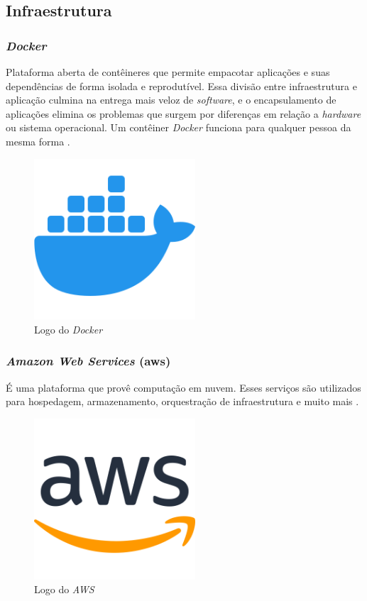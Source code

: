 \subsection{Infraestrutura} 

\subsubsection{\emph{Docker}}
Plataforma aberta de contêineres que permite empacotar aplicações e suas dependências de forma isolada e reprodutível. Essa divisão entre infraestrutura e aplicação culmina na entrega mais veloz de \emph{software}, e o encapsulamento de aplicações elimina os problemas que surgem por diferenças em relação a \emph{hardware} ou sistema operacional. Um contêiner \emph{Docker} funciona para qualquer pessoa da mesma forma \cite{docker}.

\begin{figure}[htb]
	\centering
	\includegraphics[width=6cm]{cap04-desenvolvimento/images/4-4-3-1-docker-logo.png}
	\caption{Logo do \emph{Docker}}
	\label{fig:docker-logo}
\end{figure}

\subsubsection{\emph{Amazon Web Services} (\gls{aws})} 
É uma plataforma que provê computação em nuvem. Esses serviços são utilizados para hospedagem, armazenamento, orquestração de infraestrutura e muito mais \cite{aws}.

\begin{figure}[htb]
	\centering
	\includegraphics[width=6cm]{cap04-desenvolvimento/images/4-4-3-2-aws-logo.png}
	\caption{Logo do \emph{AWS}}
	\label{fig:aws-logo}
\end{figure}

